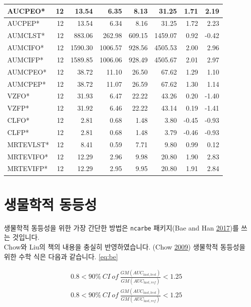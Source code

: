 \documentclass[12pt,]{krantz}
\theoremstyle{definition}
\theoremstyle{definition}
\theoremstyle{definition}
\theoremstyle{remark}
\begin{document}
\begin{tabular}{l|r|r|r|r|r|r|r}
AUCPEO* & 12 & 13.54 & 6.35 & 8.13 & 31.25 & 1.71 & 2.19\\
\hline
AUCPEP* & 12 & 13.54 & 6.34 & 8.16 & 31.25 & 1.72 & 2.23\\
\hline
AUMCLST* & 12 & 883.06 & 262.98 & 609.15 & 1459.07 & 0.92 & -0.42\\
\hline
AUMCIFO* & 12 & 1590.30 & 1006.57 & 928.56 & 4505.53 & 2.00 & 2.96\\
\hline
AUMCIFP* & 12 & 1589.85 & 1006.06 & 928.49 & 4505.67 & 2.01 & 2.97\\
\hline
AUMCPEO* & 12 & 38.72 & 11.10 & 26.50 & 67.62 & 1.29 & 1.10\\
\hline
AUMCPEP* & 12 & 38.72 & 11.07 & 26.59 & 67.62 & 1.30 & 1.14\\
\hline
VZFO* & 12 & 31.93 & 6.47 & 22.22 & 43.26 & 0.20 & -1.40\\
\hline
VZFP* & 12 & 31.92 & 6.46 & 22.22 & 43.14 & 0.19 & -1.41\\
\hline
CLFO* & 12 & 2.81 & 0.68 & 1.48 & 3.80 & -0.45 & -0.93\\
\hline
CLFP* & 12 & 2.81 & 0.68 & 1.48 & 3.79 & -0.46 & -0.93\\
\hline
MRTEVLST* & 12 & 8.41 & 0.59 & 7.71 & 9.80 & 0.99 & 0.12\\
\hline
MRTEVIFO* & 12 & 12.29 & 2.96 & 9.98 & 20.80 & 1.90 & 2.83\\
\hline
MRTEVIFP* & 12 & 12.29 & 2.95 & 9.95 & 20.80 & 1.91 & 2.84\\
\hline
\end{tabular}

\section{생물학적 동등성}\label{bioequivalence}

생물학적 동등성을 위한 가장 간단한 방법은 \texttt{ncarbe} 패키지(Bae and
Han \protect\hyperlink{ref-R-ncarbe}{2017})를 쓰는 것입니다.\\
Chow와 Liu의 책의 내용을 충실히 반영하였습니다. (Chow
\protect\hyperlink{ref-chow2009design}{2009}) 생물학적 동등성을 위한
수학 식은 다음과 같습니다. \eqref{eq:be}

\[
\begin{align}
  0.8 < 90\%\ CI\ of\ \frac{GM(AUC_{last, test})}{GM(AUC_{last, ref})} < 1.25 \\
  0.8 < 90\%\ CI\ of\ \frac{GM(AUC_{last, test})}{GM(AUC_{last, ref})} < 1.25 \label{eq:be}
\end{align}
\]
\end{document}
